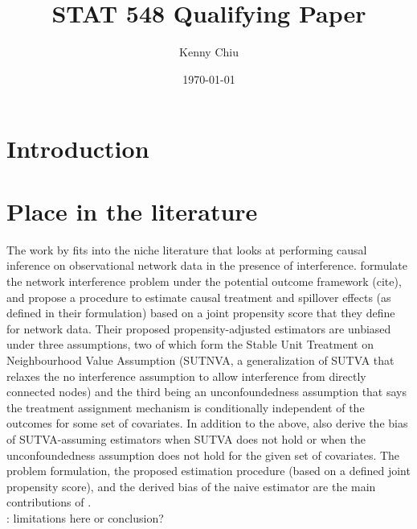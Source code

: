 \documentclass[10pt]{article}
\title{\todo\\\vspace{0.5em}\large{STAT 548 Qualifying Paper}}
\author{Kenny Chiu}
\date{\today}
\begin{document}
\maketitle

\vspace{2em}

\begin{abstract}
\todo
\end{abstract}

\vspace{2em}


\section{Introduction}


\section{Place in the literature}

The work by \textcite{Forastiere:2021} fits into the niche literature that looks at performing causal inference on observational network data in the presence of interference. \textcite{Forastiere:2021} formulate the network interference problem under the potential outcome framework (\todo cite), and propose a procedure to estimate causal treatment and spillover effects (as defined in their formulation) based on a joint propensity score that they define for network data. Their proposed propensity-adjusted estimators are unbiased under three assumptions, two of which form the Stable Unit Treatment on Neighbourhood Value Assumption (SUTNVA, a generalization of SUTVA that relaxes the no interference assumption to allow interference from directly connected nodes) and the third being an unconfoundedness assumption that says the treatment assignment mechanism is conditionally independent of the outcomes for some set of covariates. In addition to the above, \textcite{Forastiere:2021} also derive the bias of SUTVA-assuming estimators when SUTVA does not hold or when the unconfoundedness assumption does not hold for the given set of covariates. The problem formulation, the proposed estimation procedure (based on a defined joint propensity score), and the derived bias of the naive estimator are the main contributions of \citeauthor{Forastiere:2021}.
\\

\todo: limitations here or conclusion?
\\
\end{document}
